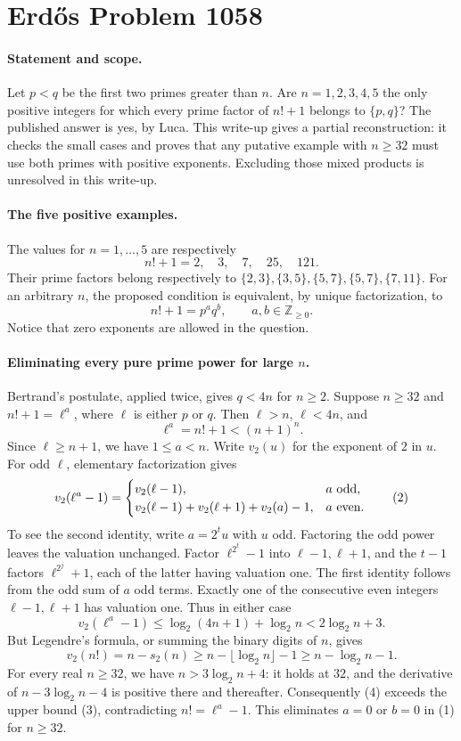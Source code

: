 \section*{Erd\H{o}s Problem 1058}

\paragraph{Statement and scope.}
Let \(p<q\) be the first two primes greater than \(n\). Are \(n=1,2,3,4,5\) the only positive integers for which every prime factor of \(n!+1\) belongs to \(\{p,q\}\)?
The published answer is yes, by Luca. This write-up gives a partial reconstruction: it checks the small cases and proves that any putative example with \(n\geq32\) must use both primes with positive exponents. Excluding those mixed products is unresolved in this write-up.

\paragraph{The five positive examples.}
The values for \(n=1,\ldots,5\) are respectively
\[
 n!+1=2,\quad3,\quad7,\quad25,\quad121.
\]
Their prime factors belong respectively to
\(\{2,3\},\{3,5\},\{5,7\},\{5,7\},\{7,11\}\).
For an arbitrary \(n\), the proposed condition is equivalent, by unique factorization, to
\[
 n!+1=p^a q^b,\qquad a,b\in\mathbb Z_{\geq0}.
 \tag{1}
\]
Notice that zero exponents are allowed in the question.

\paragraph{Eliminating every pure prime power for large \(n\).}
Bertrand's postulate, applied twice, gives \(q<4n\) for \(n\geq2\). Suppose \(n\geq32\) and \(n!+1=\ell^a\), where \(\ell\) is either \(p\) or \(q\). Then \(\ell>n\), \(\ell<4n\), and
\[
 \ell^a=n!+1<(n+1)^n.
\]
Since \(\ell\geq n+1\), we have \(1\leq a<n\).
Write \(v_2(u)\) for the exponent of \(2\) in \(u\). For odd \(\ell\), elementary factorization gives
\[
 v_2(\ell^a-1)=
 \begin{cases}
 v_2(\ell-1),&a\ \hbox{odd},\\
 v_2(\ell-1)+v_2(\ell+1)+v_2(a)-1,&a\ \hbox{even}.
 \end{cases}
 \tag{2}
\]
To see the second identity, write \(a=2^t u\) with \(u\) odd. Factoring the odd power leaves the valuation unchanged. Factor \(\ell^{2^t}-1\) into \(\ell-1,\ell+1\), and the \(t-1\) factors \(\ell^{2^j}+1\), each of the latter having valuation one. The first identity follows from the odd sum of \(a\) odd terms.
Exactly one of the consecutive even integers \(\ell-1,\ell+1\) has valuation one. Thus in either case
\[
 v_2(\ell^a-1)
 \leq\log_2(4n+1)+\log_2 n
 <2\log_2 n+3.
 \tag{3}
\]
But Legendre's formula, or summing the binary digits of \(n\), gives
\[
 v_2(n!)=n-s_2(n)\geq n-\lfloor\log_2 n\rfloor-1
 \geq n-\log_2 n-1.
 \tag{4}
\]
For every real \(n\geq32\), we have \(n>3\log_2n+4\): it holds at \(32\), and the derivative of \(n-3\log_2n-4\) is positive there and thereafter. Consequently (4) exceeds the upper bound (3), contradicting \(n!=\ell^a-1\). This eliminates \(a=0\) or \(b=0\) in (1) for \(n\geq32\).

